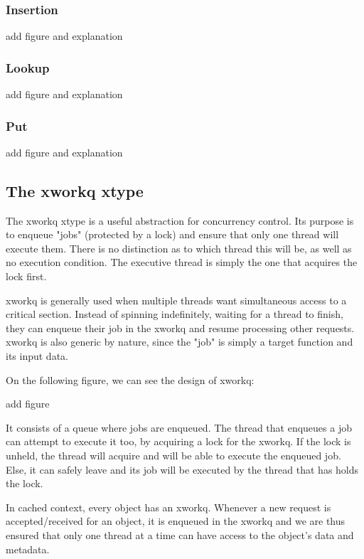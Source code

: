 \subsubsection{Insertion}

\fixme add figure and explanation

\subsubsection{Lookup}

\fixme add figure and explanation

\subsubsection{Put}

\fixme add figure and explanation

\subsection{The xworkq xtype}\label{sec:xworkq-design}

The xworkq xtype is a useful abstraction for concurrency control. Its purpose 
is to enqueue "jobs" (protected by a lock) and ensure that only one thread will 
execute them. There is no distinction as to which thread this will be, as well 
as no execution condition. The executive thread is simply the one that acquires 
the lock first.

xworkq is generally used when multiple threads want simultaneous access to a 
critical section. Instead of spinning indefinitely, waiting for a thread to 
finish, they can enqueue their job in the xworkq and resume processing other 
requests. xworkq is also generic by nature, since the "job" is simply a target 
function and its input data.

On the following figure, we can see the design of xworkq:

\fixme add figure

It consists of a queue where jobs are enqueued.  The thread that enqueues a job 
can attempt to execute it too, by acquiring a lock for the xworkq. If the lock 
is unheld, the thread will acquire and will be able to execute the enqueued 
job. Else, it can safely leave and its job will be executed by the thread that 
has holds the lock.

In cached context, every object has an xworkq. Whenever a new request is 
accepted/received for an object, it is enqueued in the xworkq and we are thus 
ensured that only one thread at a time can have access to the object's data and 
metadata.

